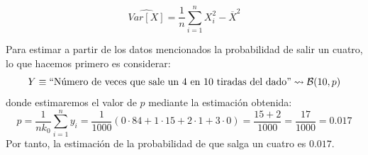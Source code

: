 \begin{ejercicio}
\begin{description}
\begin{equation*}
                \widehat{Var[X]} = \frac{1}{n}\sum\limits_{i=1}^{n}X_i^2 - \overline{X}^2
            \end{equation*}
    \end{description}
    Para estimar a partir de los datos mencionados la probabilidad de salir un cuatro, lo que hacemos primero es considerar:
    \begin{equation*}
        Y \equiv \text{``Número de veces que sale un 4 en 10 tiradas del dado''} \rightsquigarrow \mathcal{B}(10,p)
    \end{equation*}
    donde estimaremos el valor de $p$ mediante la estimación obtenida:
    \begin{equation*}
        p= \frac{1}{nk_0}\sum_{i=1}^{n}y_i = \frac{1}{1000}(0\cdot 84 + 1\cdot 15 + 2\cdot 1 + 3\cdot 0) = \frac{15+2}{1000} = \frac{17}{1000} = 0.017
    \end{equation*}
    Por tanto, la estimación de la probabilidad de que salga un cuatro es $0.017$.
\end{ejercicio}

